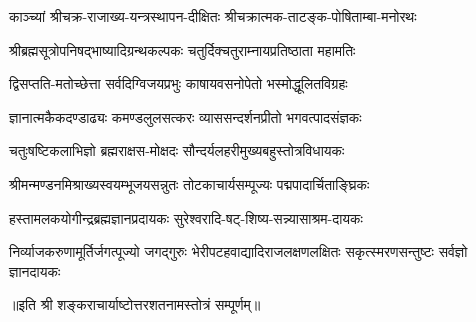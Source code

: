 \twolineshloka
{काञ्च्यां श्रीचक्र-राजाख्य-यन्त्रस्थापन-दीक्षितः}
{श्रीचक्रात्मक-ताटङ्क-पोषिताम्बा-मनोरथः}

\twolineshloka
{श्रीब्रह्मसूत्रोपनिषद्भाष्यादिग्रन्थकल्पकः}
{चतुर्दिक्चतुराम्नायप्रतिष्ठाता महामतिः}

\twolineshloka
{द्विसप्तति-मतोच्छेत्ता सर्वदिग्विजयप्रभुः}
{काषायवसनोपेतो भस्मोद्धूलितविग्रहः}

\twolineshloka
{ज्ञानात्मकैकदण्डाढ्यः कमण्डलुलसत्करः}
{व्याससन्दर्शनप्रीतो भगवत्पादसंज्ञकः}

\twolineshloka
{चतुःषष्टिकलाभिज्ञो ब्रह्मराक्षस-मोक्षदः}
{सौन्दर्यलहरीमुख्यबहुस्तोत्रविधायकः}

\twolineshloka
{श्रीमन्मण्डनमिश्राख्यस्वयम्भूजयसन्नुतः}
{तोटकाचार्यसम्पूज्यः पद्मपादार्चिताङ्घ्रिकः}

\twolineshloka
{हस्तामलकयोगीन्द्रब्रह्मज्ञानप्रदायकः}
{सुरेश्वरादि-षट्-शिष्य-सन्न्यासाश्रम-दायकः}

\threelineshloka
{निर्व्याजकरुणामूर्तिर्जगत्पूज्यो जगद्गुरुः}
{भेरीपटहवाद्यादिराजलक्षणलक्षितः}
{सकृत्स्मरणसन्तुष्टः सर्वज्ञो ज्ञानदायकः}

॥इति श्री शङ्कराचार्याष्टोत्तरशतनामस्तोत्रं सम्पूर्णम्॥
